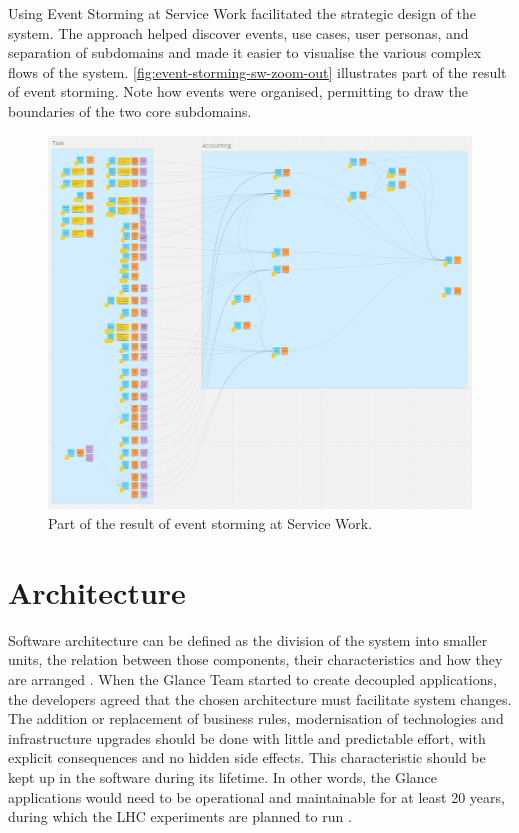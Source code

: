 Using Event Storming at Service Work facilitated the strategic design of the system. The approach helped discover events, use cases, user personas, and separation of subdomains and made it easier to visualise the various complex flows of the system. \autoref{fig:event-storming-sw-zoom-out} illustrates part of the result of event storming. Note how events were organised, permitting to draw the boundaries of the two core subdomains.

\begin{figure}[htbp]
  \centering
  \includegraphics[scale=0.5]{Imagens/chap04/event-storming-sw-zoom-out.png}
  \caption{Part of the result of event storming at Service Work.}
  \label{fig:event-storming-sw-zoom-out}
\end{figure}

\section{Architecture}

Software architecture can be defined as the division of the system into smaller units, the relation between those components, their characteristics and how they are arranged \cite{sven-woltmann-hexagonal-architecture}. When the Glance Team started to create decoupled applications, the developers agreed that the chosen architecture must facilitate system changes. The addition or replacement of business rules, modernisation of technologies and infrastructure upgrades should be done with little and predictable effort, with explicit consequences and no hidden side effects. This characteristic should be kept up in the software during its lifetime. In other words, the Glance applications would need to be operational and maintainable for at least 20 years, during which the LHC experiments are planned to run \cite{lhc-end-of-life}.

